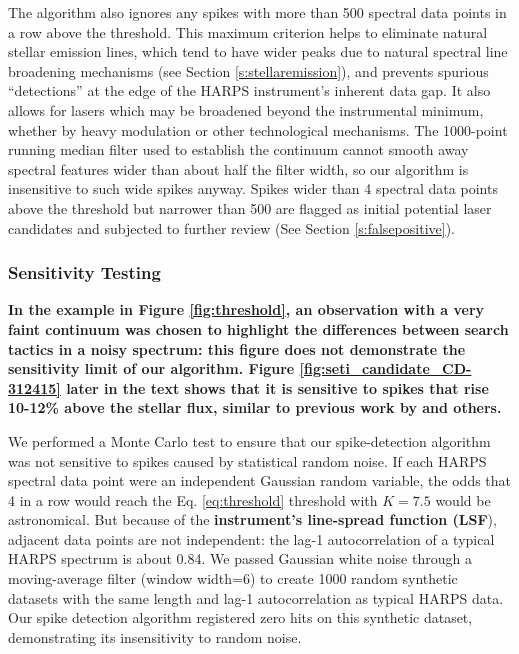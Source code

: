 \documentclass[linenumbers]{aastex701}
\providecommand{\DIFadd}[1]{{\bf #1}} %
\providecommand{\DIFaddbegin}{} %
\providecommand{\DIFaddend}{} %
\begin{document}
The algorithm also ignores any spikes with more than 500 spectral data points in a row above the threshold. This maximum criterion helps to eliminate natural stellar emission lines, which tend to have wider peaks due to natural spectral line broadening mechanisms (see Section \ref{s:stellaremission}), and prevents spurious  \DIFaddbegin \enquote{detections} \DIFaddend at the edge of the HARPS instrument's inherent data gap. It also allows for lasers which may be broadened beyond the instrumental minimum, whether by heavy modulation or other technological mechanisms. The 1000-point running median filter used to establish the continuum cannot smooth away spectral features wider than about half the filter width, so our algorithm is insensitive to such wide spikes anyway.  Spikes wider than 4 spectral data points above the threshold but narrower than 500 are flagged as initial potential laser candidates and subjected to further review (See Section \ref{s:falsepositive}). 

\subsubsection{Sensitivity  \DIFaddbegin \DIFadd{Testing}\DIFaddend }
\DIFaddbegin 

\DIFadd{In the example in Figure \ref{fig:threshold}, an observation with a very faint continuum was chosen to highlight the differences between search tactics in a noisy spectrum: this figure does not demonstrate the sensitivity limit of our algorithm.  Figure \ref{fig:seti_candidate_CD-312415} later in the text shows that it is sensitive to spikes that rise 10-12\% above the stellar flux, similar to previous work by \cite{Tellis_2017} and others.
}

\DIFaddend We performed a Monte Carlo test to ensure that our spike-detection algorithm was not sensitive to spikes caused by statistical random noise.  If each HARPS spectral data point were an independent Gaussian random variable, the odds that 4 in a row would reach the Eq. \ref{eq:threshold} threshold with $K=7.5$ would be astronomical.  But because of the  \DIFaddbegin \DIFadd{instrument's line-spread function (LSF}\DIFaddend ), adjacent data points are not independent: the lag-1 autocorrelation of a typical HARPS spectrum is about 0.84.  We passed Gaussian white noise through a moving-average filter (window width=6) to create 1000 random synthetic datasets with the same length and lag-1 autocorrelation as typical HARPS data.  Our spike detection algorithm registered zero hits on this synthetic dataset, demonstrating its insensitivity to random noise.
\end{document}
